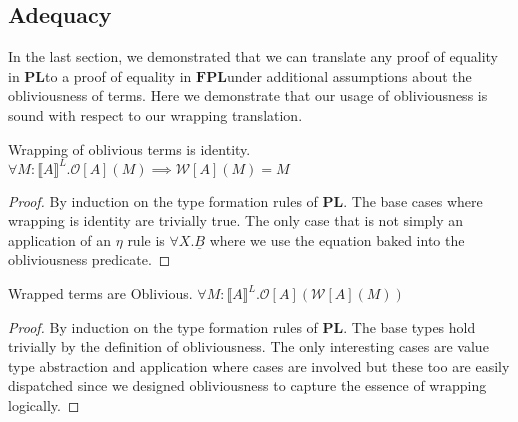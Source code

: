 \documentclass[acmsmall]{acmart}
\newcommand{\den}[1]{\llbracket #1\rrbracket}
\newcommand{\pl}{$\mathbf{PL}$}
\newcommand{\fpl}{$\mathbf{FPL}$}
\begin{document}
\subsection{Adequacy}
\label{sec:Adequacy}
In the last section, we demonstrated that we can translate any proof of equality in \pl\;to a proof of equality in \fpl\;under additional assumptions about the obliviousness of terms.
Here we demonstrate that our usage of obliviousness is sound with respect to our wrapping translation. 

\begin{lemma} Wrapping of oblivious terms is identity.
  \label{lem:wrapid}
  $\forall M : \den{A}^L. \mathcal{O}[A](M) \implies \mathcal{W}[A](M) = M$
 \end{lemma}
 
 \begin{proof}
   By induction on the type formation rules of \pl. The base cases where wrapping is identity are trivially true. The only case that is not simply an application of an $\eta$ rule is $\forall X. \underline{B}$ where we use the equation baked into the obliviousness predicate.
 \end{proof}
 
 
 \begin{lemma}Wrapped terms are Oblivious.
  \label{lem:oblivwrap}
   $\forall M : \den{A}^L. \mathcal{O}[A](\mathcal{W}[A](M))$
  \end{lemma}
  
  \begin{proof} 
    By induction on the type formation rules of \pl. The base types hold trivially by the definition of obliviousness. The only interesting cases are value type abstraction and application where cases are involved but these too are easily dispatched since we designed obliviousness to capture the essence of wrapping logically.
  \end{proof}
\end{document}

